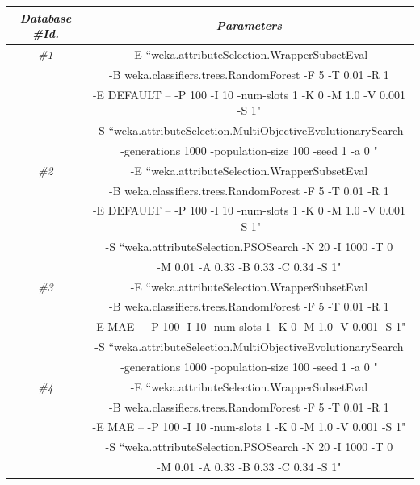 \documentclass[journal,twoside,web]{ieeecolor}
\begin{document}
\begin{table}[h!]
	\begin{center}
		\footnotesize{\begin{tabular}{cc}\hline
			\textit{\textbf{Database \#Id.}} & \textit{\textbf{Parameters}} \\\hline
			
			\textit{\#1} &  -E ``weka.attributeSelection.WrapperSubsetEval \\
			& -B weka.classifiers.trees.RandomForest  -F 5 -T 0.01 -R 1 \\
			& -E DEFAULT -- -P 100 -I 10 -num-slots 1 -K 0 -M 1.0 -V 0.001 -S 1" \\
			& -S ``weka.attributeSelection.MultiObjectiveEvolutionarySearch \\ 
			& -generations 1000 -population-size 100 -seed 1 -a 0 "\\
			
			
			\textit{\#2} &  -E ``weka.attributeSelection.WrapperSubsetEval \\
			& -B weka.classifiers.trees.RandomForest -F 5 -T 0.01 -R 1 \\
			& -E DEFAULT -- -P 100 -I 10 -num-slots 1 -K 0 -M 1.0 -V 0.001 -S 1" \\
			& -S ``weka.attributeSelection.PSOSearch -N 20 -I 1000 -T 0 \\
			&  -M 0.01 -A 0.33 -B 0.33 -C 0.34  -S 1"\\
			
			\textit{\#3} &  -E ``weka.attributeSelection.WrapperSubsetEval \\
			& -B weka.classifiers.trees.RandomForest  -F 5 -T 0.01 -R 1 \\
			& -E MAE -- -P 100 -I 10 -num-slots 1 -K 0 -M 1.0 -V 0.001 -S 1" \\
			& -S ``weka.attributeSelection.MultiObjectiveEvolutionarySearch \\ 
			& -generations 1000 -population-size 100 -seed 1 -a 0 "\\
			
			
			\textit{\#4} &  -E ``weka.attributeSelection.WrapperSubsetEval \\
			& -B weka.classifiers.trees.RandomForest -F 5 -T 0.01 -R 1 \\
			& -E MAE -- -P 100 -I 10 -num-slots 1 -K 0 -M 1.0 -V 0.001 -S 1" \\
			& -S ``weka.attributeSelection.PSOSearch -N 20 -I 1000 -T 0 \\
			&  -M 0.01 -A 0.33 -B 0.33 -C 0.34  -S 1"\\
			

\end{tabular}}
\end{center}
\end{table}
\end{document}
